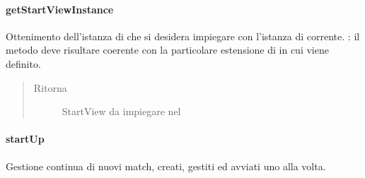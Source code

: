 \documentclass[letterpaper,10pt,italian,openany,oneside]{sphinxmanual}
\begin{document}
\paragraph{getStartViewInstance}
\label{\detokenize{source/it/unicam/cs/pa/mastermind/gamecore/MainManager:getstartviewinstance}}

\begin{fulllineitems}
\label{\detokenize{source/it/unicam/cs/pa/mastermind/gamecore/MainManager:it.unicam.cs.pa.mastermind.gamecore.MainManager.getStartViewInstance()}}
Ottenimento dell’istanza di  che si desidera impiegare con l’istanza di  corrente. : il metodo deve risultare coerente con la particolare estensione di  in cui viene definito.
\begin{quote}\begin{description}
\item[{Ritorna}] \leavevmode
StartView da impiegare nel 

\end{description}\end{quote}

\end{fulllineitems}



\paragraph{startUp}
\label{\detokenize{source/it/unicam/cs/pa/mastermind/gamecore/MainManager:startup}}

\begin{fulllineitems}
\label{\detokenize{source/it/unicam/cs/pa/mastermind/gamecore/MainManager:it.unicam.cs.pa.mastermind.gamecore.MainManager.startUp()}}
Gestione continua di nuovi match, creati, gestiti ed avviati uno alla volta.

\end{fulllineitems}
\end{document}

